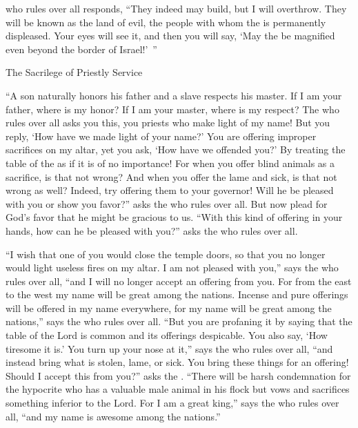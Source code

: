 {{}
who rules over all
responds,
“They
indeed may build,
but I
will overthrow.
They will be known
as
the land
of evil,
the people
with whom
the {}
is permanently
displeased.
Your eyes
will see
it, and then you
will say,
‘May the
{}
be magnified
even beyond the border
of Israel!’ ”
\par }{\SH The Sacrilege of Priestly Service
\par }{\PP {}“A son
naturally honors
his father
and a slave
respects
his master.
If
I am
your father,
where
is my honor? If
I am
your master,
where
is my respect? The
{}
who rules over all
asks you this, you priests
who make light
of my name! But you reply,
‘How
have we made light
of your name?’
You are offering
improper
sacrifices
on
my altar,
yet you ask,
‘How
have we offended
you?’ By treating
the table
of the {}
as if it is
of no importance!
For
when
you offer
blind
animals as a sacrifice,
is that not
wrong? And when
you offer
the lame
and sick,
is that not
wrong
as well? Indeed, try offering
them to your governor! Will he be pleased
with you or
show
you favor?” asks
the
{}
who rules over all.
But now
plead
for God’s
favor that he might be gracious
to us. “With
this
kind
of offering
in your hands,
how can he be
pleased
with you?” asks
the {}
who rules over all.
\par }{\PP {}“I wish
that one of you would close
the temple doors,
so that you no
longer would light
useless fires
on my altar.
I am
not
pleased
with you,” says
the {}
who rules over all,
“and I will no
longer accept
an offering from you.
For
from the east
to the west
my name
will be great
among the nations.
Incense
and pure
offerings
will be offered
in my name
everywhere, for
my name
will be great
among the nations,”
says
the {}
who rules over all.
“But you
are profaning
it by saying
that the table
of the Lord
is
common and its offerings
despicable.
You also say,
‘How tiresome
it is.’ You turn up your nose
at it,” says
the {}
who rules over all,
“and instead bring
what is stolen,
lame,
or sick.
You bring
these things for an offering! Should I accept
this from you?” asks
the {}.
“There will be harsh condemnation
for the hypocrite
who has a valuable male
animal in his flock
but vows
and sacrifices
something inferior to the Lord.
For
I
am a great
king,”
says
the {}
who rules over all,
“and my name
is awesome
among the nations.”

}
